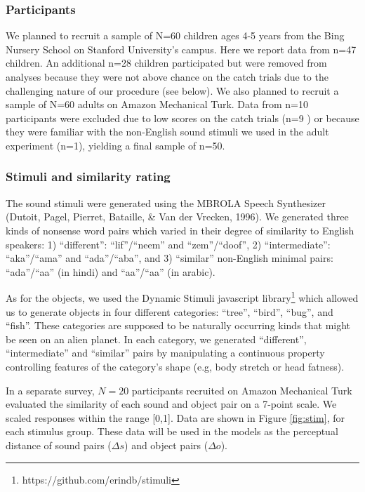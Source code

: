 \documentclass[10pt, letterpaper]{article}
\begin{document}
\subsubsection{Participants}\label{participants}

We planned to recruit a sample of N=60 children ages 4-5 years from the
Bing Nursery School on Stanford University's campus. Here we report data
from n=47 children. An additional n=28 children participated but were
removed from analyses because they were not above chance on the catch
trials due to the challenging nature of our procedure (see below). We
also planned to recruit a sample of N=60 adults on Amazon Mechanical
Turk. Data from n=10 participants were excluded due to low scores on the
catch trials (n=9 ) or because they were familiar with the non-English
sound stimuli we used in the adult experiment (n=1), yielding a final
sample of n=50.

\subsubsection{Stimuli and similarity
rating}\label{stimuli-and-similarity-rating}

The sound stimuli were generated using the MBROLA Speech Synthesizer
(Dutoit, Pagel, Pierret, Bataille, \& Van der Vrecken, 1996). We
generated three kinds of nonsense word pairs which varied in their
degree of similarity to English speakers: 1) ``different'':
``lif''/``neem'' and ``zem''/``doof'', 2) ``intermediate'':
``aka''/``ama'' and ``ada''/``aba'', and 3) ``similar'' non-English
minimal pairs: ``ada''/``aa'' (in hindi) and
``aa''/``a\textipa{\textcrh}a'' (in arabic).

As for the objects, we used the Dynamic Stimuli javascript
library\footnote{https://github.com/erindb/stimuli} which allowed us to
generate objects in four different categories: ``tree'', ``bird'',
``bug'', and ``fish''. These categories are supposed to be naturally
occurring kinds that might be seen on an alien planet. In each category,
we generated ``different'', ``intermediate'' and ``similar'' pairs by
manipulating a continuous property controlling features of the
category's shape (e.g, body stretch or head fatness).

In a separate survey, \(N=20\) participants recruited on Amazon
Mechanical Turk evaluated the similarity of each sound and object pair
on a 7-point scale. We scaled responses within the range {[}0,1{]}. Data
are shown in Figure \ref{fig:stim}, for each stimulus group. These data
will be used in the models as the perceptual distance of sound pairs
(\(\Delta s\)) and object pairs (\(\Delta o\)).
\end{document}
